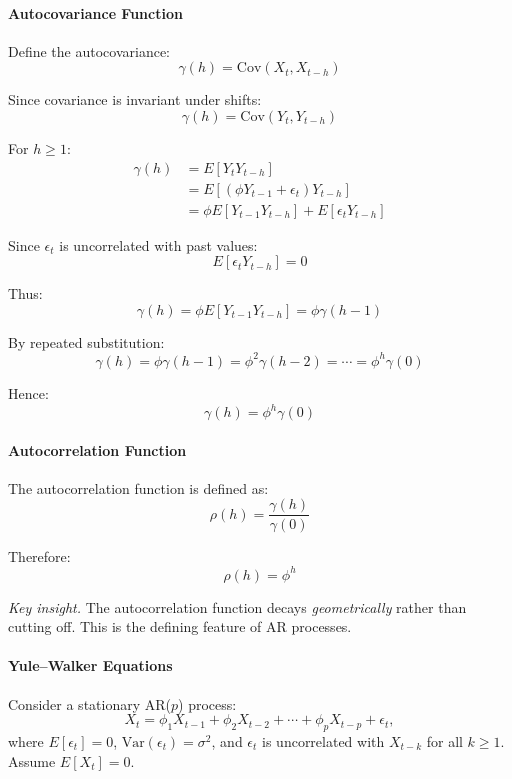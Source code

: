 \documentclass[10pt,a4paper]{article}
\begin{document}
	\paragraph{Autocovariance Function}
	
	Define the autocovariance:
	\[
	\gamma(h) = \mathrm{Cov}(X_t, X_{t-h})
	\]
	
	Since covariance is invariant under shifts:
	\[
	\gamma(h) = \mathrm{Cov}(Y_t, Y_{t-h})
	\]
	
	For \(h \geq 1\):
	\begin{align*}
	\gamma(h) &= E[Y_t Y_{t-h}] \\
	          &= E[(\phi Y_{t-1} + \epsilon_t) Y_{t-h}] \\
	          &= \phi E[Y_{t-1} Y_{t-h}] + E[\epsilon_t Y_{t-h}]
	\end{align*}
	
	Since \(\epsilon_t\) is uncorrelated with past values:
	\[
	E[\epsilon_t Y_{t-h}] = 0
	\]
	
	Thus:
	\[
	\gamma(h) = \phi E[Y_{t-1} Y_{t-h}] = \phi \gamma(h-1)
	\]
	
	By repeated substitution:
	\[
	\gamma(h) = \phi \gamma(h-1) = \phi^2 \gamma(h-2) = \cdots = \phi^h \gamma(0)
	\]
	
	Hence:
	\[
	\gamma(h) = \phi^h \gamma(0)
	\]
	
	\paragraph{Autocorrelation Function}
	
	The autocorrelation function is defined as:
	\[
	\rho(h) = \frac{\gamma(h)}{\gamma(0)}
	\]
	
	Therefore:
	\[
	\rho(h) = \phi^h
	\]
	
	
	\textit{Key insight.} The autocorrelation function decays \textit{geometrically} rather than cutting off. This is the defining feature of AR processes.
	
	\paragraph{Yule--Walker Equations}
	
	Consider a stationary AR($p$) process:
	\[
	X_t = \phi_1 X_{t-1} + \phi_2 X_{t-2} + \cdots + \phi_p X_{t-p} + \epsilon_t,
	\]
	where \(E[\epsilon_t] = 0\), \(\mathrm{Var}(\epsilon_t) = \sigma^2\), and \(\epsilon_t\) is uncorrelated with \(X_{t-k}\) for all \(k \geq 1\). Assume \(E[X_t] = 0\).
	
\end{document}
